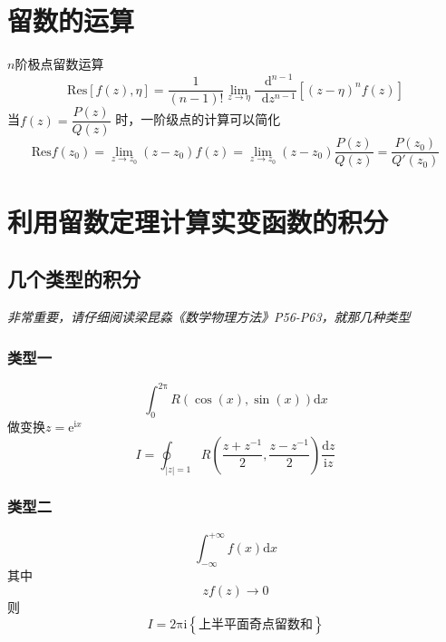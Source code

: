 \documentclass{article}
\newcommand*{\md}{\mathop{}\!\mathrm{d}}
\begin{document}
\section{留数的运算}
$n$阶极点留数运算
\begin{equation*}
  \mathrm{Res} \left[ f(z),\eta \right] = \dfrac{1}{(n - 1)!} \lim\limits_{z \rightarrow \eta} \dfrac{\md^{n-1}}{\md z^{n-1}} \left[ (z-\eta)^{n} f(z) \right]
\end{equation*}
当$f(z) = \dfrac{P(z)}{Q(z)} $ 时，一阶级点的计算可以简化
\begin{equation*}
  \mathrm{Res} f(z_{0}) = \lim\limits_{z \rightarrow z_{0}} (z - z_{0}) f(z) = \lim\limits_{z \rightarrow z_{0}} (z - z_{0}) \dfrac{P(z)}{Q(z)} =  \dfrac{P(z_{0})}{Q'(z_{0})} 
\end{equation*}

\section{利用留数定理计算实变函数的积分}

\subsection{几个类型的积分}



\emph{非常重要，请仔细阅读梁昆淼《数学物理方法》P56-P63，就那几种类型}

\subsubsection{类型一}

\begin{equation*}
  \int_{0}^{2\mathrm{\pi}} R \left( \cos(x),\sin(x) \right) \mathrm{d} x
\end{equation*}
做变换$z = \mathrm{e}^{\mathrm{i} x} $
\begin{equation*}
  I = \oint_{|z|=1} R \left( \dfrac{z+z^{-1}}{2} ,\dfrac{z-z^{-1}}{2}  \right) \dfrac{\mathrm{d} z}{\mathrm{i} z} 
\end{equation*}

\subsubsection{类型二}

\begin{equation*}
  \int_{- \infty}^{+ \infty} f(x) \mathrm{d} x
\end{equation*}
其中
\begin{equation*}
  zf(z) \rightarrow  0 
\end{equation*}
则
\begin{equation*}
  I = 2 \mathrm{\pi} \mathrm{i} \left\{ \text{上半平面奇点留数和} \right\}
\end{equation*}
\end{document}
